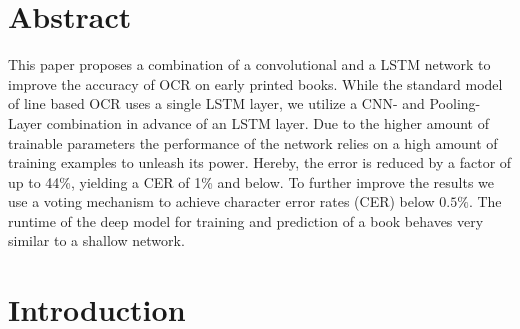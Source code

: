 \documentclass{jlcl}
\title{\articletitle}
\author{Christoph Wick\\
University of Wrzburg\\
\texttt{christoph.wick@uni-wuerzburg.de} \and
Christian Reul\\
University of Wrzburg\\
\texttt{christian.reul@uni-wuerzburg.de} \and
Frank Puppe\\
University of Wrzburg\\
\texttt{frank.puppe@uni-wuerzburg.de}
}
\begin{document}
\setcounter{page}{1}
\thispagestyle{firstpage}

\authordata


\section*{Abstract}

This paper proposes a combination of a convolutional and a LSTM network to improve the accuracy of OCR on early printed books.
While the standard model of line based OCR uses a single LSTM layer, we utilize a CNN- and Pooling-Layer combination in advance of an LSTM layer.
Due to the higher amount of trainable parameters the performance of the network relies on a high amount of training examples to unleash its power.
Hereby, the error is reduced by a factor of up to 44\%, yielding a CER of 1\% and below.
To further improve the results we use a voting mechanism to achieve character error rates (CER) below $0.5\%$.
The runtime of the deep model for training and prediction of a book behaves very similar to a shallow network.

\section{Introduction}
\end{document}
